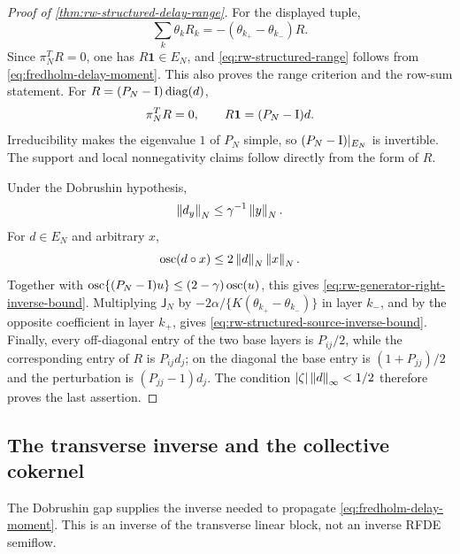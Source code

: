 \begin{proof}[Proof of \cref{thm:rw-structured-delay-range}]

For the displayed tuple,
\[
 \sum_k\theta_kR_k
 =-(\theta_{k_+}-\theta_{k_-})R.
\]
Since \(\pi_N^TR=0\), one has \(R\mathbf1\in E_N\), and
\cref{eq:rw-structured-range} follows from
\cref{eq:fredholm-delay-moment}.  This also proves the range criterion and
the row-sum statement.  For
\(R=(P_N-\mathrm I)\operatorname{diag}(d)\),
\[
 \pi_N^TR=0,\qquad R\mathbf1=(P_N-\mathrm I)d.
\]
Irreducibility makes the eigenvalue \(1\) of \(P_N\) simple, so
\((P_N-\mathrm I)|_{E_N}\) is invertible.  The support and local nonnegativity
claims follow directly from the form of \(R\).

Under the Dobrushin hypothesis,
\[
 \left\lVert d_y\right\rVert_N\le\gamma^{-1}\left\lVert y\right\rVert_N.
\]
For \(d\in E_N\) and arbitrary \(x\),
\[
 \operatorname{osc}(d\circ x)\le2\left\lVert d\right\rVert_N\left\lVert x\right\rVert_N.
\]
Together with
\(\operatorname{osc}\{(P_N-\mathrm I)u\}\le(2-\gamma)\operatorname{osc}(u)\), this gives
\cref{eq:rw-generator-right-inverse-bound}.  Multiplying
\(\mathsf J_N\) by \(-2\alpha/
\{K(\theta_{k_+}-\theta_{k_-})\}\) in layer \(k_-\), and by the opposite
coefficient in layer \(k_+\), gives
\cref{eq:rw-structured-source-inverse-bound}.  Finally, every off-diagonal
entry of the two base layers is \(P_{ij}/2\), while the corresponding entry of
\(R\) is \(P_{ij}d_j\); on the diagonal the base entry is
\((1+P_{jj})/2\) and the perturbation is
\((P_{jj}-1)d_j\).  The condition
\(|\zeta|\left\lVert d\right\rVert_\infty<1/2\) therefore proves the last assertion.
\end{proof}

\subsection{The transverse inverse and the collective cokernel}

The Dobrushin gap supplies the inverse needed to propagate
\cref{eq:fredholm-delay-moment}.  This is an inverse of the transverse
linear block, not an inverse RFDE semiflow.


